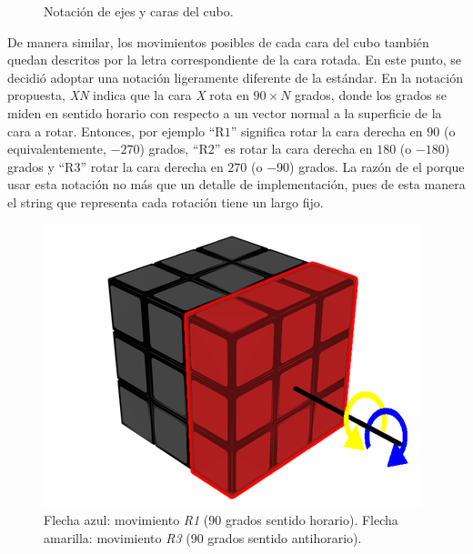 \begin{figure}[h!]
	\centering
	\hfill
	\caption{Notación de ejes y caras del cubo.}
\end{figure}
De manera similar, los movimientos posibles de cada cara del cubo también quedan descritos por la letra correspondiente de la cara rotada.
En este punto, se decidió adoptar una notación ligeramente diferente de la estándar.
En la notación propuesta, \textit{XN} indica que la cara \textit{X} rota en $90 \times N$ grados, donde los grados se miden en sentido horario con respecto a un vector normal a la superficie de la cara a rotar.
Entonces, por ejemplo ``R$1$'' significa rotar la cara derecha en $90$ (o equivalentemente, $-270$) grados, ``R$2$'' es rotar la cara derecha en $180$ (o $-180$) grados y ``R$3$'' rotar la cara derecha en $270$ (o $-90$) grados.
La razón de el porque usar esta notación no más que un detalle de implementación, pues de esta manera el string que representa cada rotación tiene un largo fijo.

\begin{figure}[h!]
	\centering
	\includegraphics[scale=0.3]{figures/R1}
	\caption[Ejemplo de rotación.]{Flecha azul: movimiento \textit{R1} ($90$ grados sentido horario). Flecha amarilla: movimiento \textit{R3} (90 grados sentido antihorario).}
	\label{moveR}
\end{figure}

